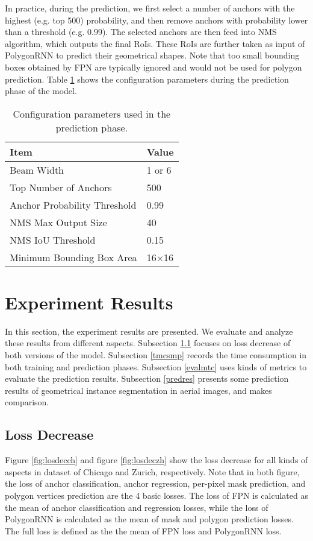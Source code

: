 
In practice, during the prediction, we first select a number of anchors with the highest (e.g. top 500) probability, and then remove anchors with probability lower than a threshold (e.g. 0.99). The selected anchors are then feed into NMS algorithm, which outputs the final RoIs. These RoIs are further taken as input of PolygonRNN to predict their geometrical shapes. Note that too small bounding boxes obtained by FPN are typically ignored and would not be used for polygon prediction. Table \ref{tab:prdphs} shows the configuration parameters during the prediction phase of the model.
\begin{table}[!h]
	\centering
	\caption[Configuration parameters used in the prediction phase]{Configuration parameters used in the prediction phase.}
	\label{tab:prdphs}
	\begin{tabular}{l|l}
	\hline
	\textbf{Item} & \textbf{Value} \\
	\hline
	Beam Width & 1 or 6 \\
	Top Number of Anchors & 500 \\
	Anchor Probability Threshold & 0.99 \\
	NMS Max Output Size & 40 \\
	NMS IoU Threshold & 0.15 \\
	Minimum Bounding Box Area & 16$\times$16 \\
	\hline
	\end{tabular}
\end{table}

\section{Experiment Results}\label{expres}
In this section, the experiment results are presented. We evaluate and analyze these results from different aspects. Subsection \ref{lossdec} focuses on loss decrease of both versions of the model. Subsection \ref{tmcsmp} records the time consumption in both training and prediction phases. Subsection \ref{evalmtc} uses kinds of metrics to evaluate the prediction results. Subsection \ref{predres} presents some prediction results of geometrical instance segmentation in aerial images, and makes comparison.

\subsection{Loss Decrease}\label{lossdec}
Figure \ref{fig:losdecch} and figure \ref{fig:losdeczh} show the loss decrease for all kinds of aspects in dataset of Chicago and Zurich, respectively. Note that in both figure, the loss of anchor classification, anchor regression, per-pixel mask prediction, and polygon vertices prediction are the 4 basic losses. The loss of FPN is calculated as the mean of anchor classification and regression losses, while the loss of PolygonRNN is calculated as the mean of mask and polygon prediction losses. The full loss is defined as the the mean of FPN loss and PolygonRNN loss.

